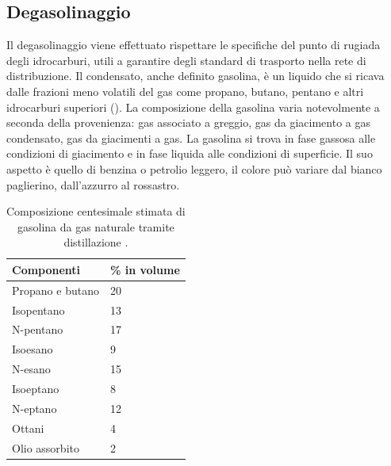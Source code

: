 \subsection{Degasolinaggio} \label{subsection:gasolina}
Il degasolinaggio viene effettuato rispettare le specifiche del punto di rugiada degli idrocarburi, utili a garantire degli standard di trasporto nella rete di distribuzione. Il condensato, anche definito gasolina, è un liquido che si ricava dalle frazioni meno volatili del gas come propano, butano, pentano e altri idrocarburi superiori (). La composizione della gasolina varia notevolmente a seconda della provenienza: gas associato a greggio, gas da giacimento a gas condensato, gas da giacimenti a gas. La gasolina si trova in fase gassosa alle condizioni di giacimento e in fase liquida alle condizioni di superficie. Il suo aspetto è quello di benzina o petrolio leggero, il colore può variare dal bianco paglierino, dall'azzurro al rossastro.
\begin{table}[htbp]
    \small
    \centering
    \caption{Composizione centesimale stimata di gasolina da gas naturale tramite distillazione \parencite{anderson1924composition}.}
    \label{tab:gasoline-composition}
    \begin{tabular}{p{}p{}}
        \hline
        {\bf Componenti}                & {\textbf{\% in volume}}       \\ \hline
        Propano e butano                & {20}                          \\
        Isopentano                      & {13}                          \\
        N-pentano                       & {17}                          \\
        Isoesano                        & {9}                           \\
        N-esano                         & {15}                          \\
        Isoeptano                       & {8}                           \\
        N-eptano                        & {12}                          \\
        Ottani                          & {4}                           \\
        Olio assorbito                  & {2}                           \\ \hline
    \end{tabular}
\end{table}
